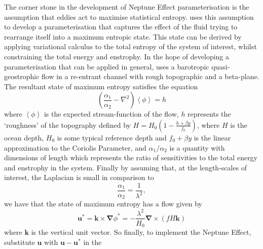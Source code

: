 \documentclass[12pt,a4paper]{report}
\begin{document}
                	The corner stone in the development of Neptune Effect parameterisation is the assumption that eddies act to maximise statistical entropy. \cite{holloway1992representing} uses this assumption to develop a parameterisation that captures the effect of the fluid trying to rearrange itself into a maximum entropic state. This state can be derived by applying variational calculus to the total entropy of the system of interest, whilst
                	constraining the total energy and enstrophy. In the hope of developing a parameterisation that can be applied in general, \cite{holloway1992representing} uses a barotropic quasi-geostrophic flow in a re-entrant channel with rough topographic and a beta-plane. The resultant state of maximum entropy satisfies the equation 
                	\begin{equation}
                	\left(\frac{\alpha_{1}}{\alpha_{2}}-\nabla^{2}\right)\left\langle\phi\right\rangle=h
                	\end{equation} 
                	where  $\left\langle\phi\right\rangle$  
                	 is the expected stream-function of the flow, $h$ represents the `roughness' of the topography defined by 
                	  $H=H_{0}\left(1-\frac{h+\beta y}{f_{0}}\right)$, where $H$ is the ocean depth, $H_{0}$ is some typical reference  depth and $f_{0}+\beta y$ is the linear approximation to the Coriolis Parameter, and ${\alpha_{1}}/{\alpha_{2}}$ is a quantity with dimensions of length which represents the ratio of 
                	  sensitivities to the total energy and enstrophy in the system. Finally by
                	  assuming that, at the length-scales of interest, the Laplacian is small in
                	  comparison to
                	  \begin{equation*}
                	  \frac{\alpha_{1}}{\alpha_{2}}=\frac{1}{\lambda^{2}},
                	  \end{equation*} 
                	  we have that the state of maximum entropy has a flow given by  
                	\begin{equation}
                	\boldsymbol{u}^{\ast}=\boldsymbol{k}\times\boldsymbol{\nabla}\phi^{\ast}=
                	-\frac{\lambda^{2}}{H_{0}}
                	\boldsymbol{\nabla}\times \left(fH\boldsymbol{k}\right)
                	\end{equation}
                	where $\boldsymbol{k}$ is the vertical unit vector.
                	So finally, to implement the Neptune Effect, substitute $\boldsymbol{u}$ with $\boldsymbol{u}-\boldsymbol{u}^{\ast}$ in the
\end{document}
